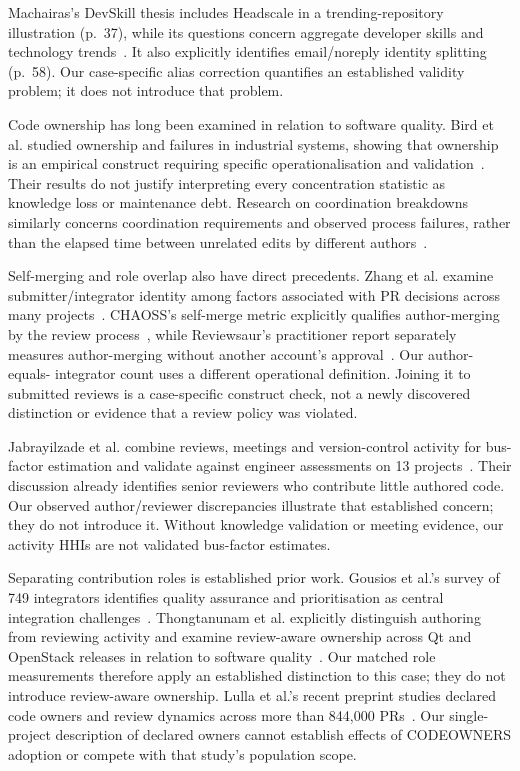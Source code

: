 \documentclass[11pt]{article}
\begin{document}
Machairas's DevSkill thesis includes Headscale in a trending-repository
illustration (p.~37), while its questions concern aggregate developer skills
and technology trends~\cite{machairas2025devskill}. It also explicitly identifies
email/noreply identity splitting (p.~58). Our case-specific alias correction
quantifies an established validity problem; it does not introduce that problem.

Code ownership has long been examined in relation to software quality.
Bird et al. studied ownership and failures in industrial systems, showing that
ownership is an empirical construct requiring specific operationalisation
and validation~\cite{bird2011ownership}. Their results do not justify interpreting
every concentration statistic as knowledge loss or maintenance debt.
Research on coordination breakdowns similarly concerns coordination requirements
and observed process failures, rather than the elapsed time between unrelated
edits by different authors~\cite{cataldo2013coordination}.

Self-merging and role overlap also have direct precedents. Zhang et al. examine
submitter/integrator identity among factors associated with PR decisions across
many projects~\cite{zhang2023prdecisions}. CHAOSS's self-merge metric explicitly
qualifies author-merging by the review process~\cite{chaoss_selfmerge}, while
Reviewsaur's practitioner report separately measures author-merging without
another account's approval~\cite{reviewsaur2026methodology}. Our author-equals-
integrator count uses a different operational definition. Joining it to submitted
reviews is a case-specific construct check, not a newly discovered distinction
or evidence that a review policy was violated.

Jabrayilzade et al. combine reviews, meetings and version-control activity for
bus-factor estimation and validate against engineer assessments on 13
projects~\cite{jabrayilzade2022bus}. Their discussion already identifies senior
reviewers who contribute little authored code. Our observed author/reviewer
discrepancies illustrate that established concern; they do not introduce it.
Without knowledge validation or meeting evidence, our activity HHIs are not
validated bus-factor estimates.

Separating contribution roles is established prior work. Gousios et al.'s
survey of 749 integrators identifies quality assurance and prioritisation as
central integration challenges~\cite{gousios2015integrators}.
Thongtanunam et al. explicitly distinguish authoring from reviewing activity
and examine review-aware ownership across Qt and OpenStack releases
in relation to software quality~\cite{thongtanunam2016reviewownership}.
Our matched role measurements therefore apply an established distinction to
this case; they do not introduce review-aware ownership.
Lulla et al.'s recent preprint studies declared code owners and review dynamics
across more than 844,000 PRs~\cite{lulla2026codeowners}.
Our single-project description of declared owners cannot establish effects of
CODEOWNERS adoption or compete with that study's population scope.
\end{document}

